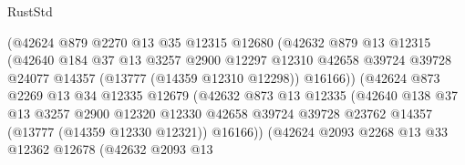\begin{lexlean}{RustStd}
\begin{coremodule}
                              (@42624
                                @879
                                @2270
                                @13
                                @35
                                @12315
                                @12680
                                (@42632
                                  @879
                                  @13
                                  @12315
                                  (@42640
                                    @184
                                    @37
                                    @13
                                    @3257
                                    @2900
                                    @12297
                                    @12310
                                    @42658
                                    @39724
                                    @39728
                                    @24077
                                    @14357
                                    (@13777 (@14359 @12310 @12298))
                                    @16166))
                                (@42624
                                  @873
                                  @2269
                                  @13
                                  @34
                                  @12335
                                  @12679
                                  (@42632
                                    @873
                                    @13
                                    @12335
                                    (@42640
                                      @138
                                      @37
                                      @13
                                      @3257
                                      @2900
                                      @12320
                                      @12330
                                      @42658
                                      @39724
                                      @39728
                                      @23762
                                      @14357
                                      (@13777 (@14359 @12330 @12321))
                                      @16166))
                                  (@42624
                                    @2093
                                    @2268
                                    @13
                                    @33
                                    @12362
                                    @12678
                                    (@42632
                                      @2093
                                      @13

\end{coremodule}
\end{lexlean}

